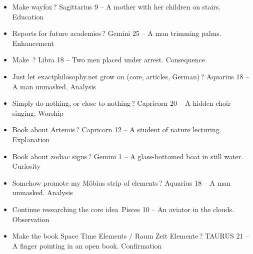 \begin{itemize}

\item[(1)] {\color{xphi}Make wayfox\,?}\newline
Sagittarius 9 – A mother with her children on stairs. {\color{gray}Education}

\vspace{-2mm}
\item[(2)] {\color{xphi}Reports for future academies\,?}\newline
Gemini 25 – A man trimming palms.  {\color{gray}Enhancement}

\vspace{-2mm}
\item[(3)] {\color{xphi}Make \ELEMENTAL\,?}\newline
Libra 18 – Two men placed under arrest.  {\color{gray}Consequence}

\vspace{-2mm}
\item[(4)] {\color{xphi}Just let exactphilosophy.net grow on (core, articles, German)\,?}\newline
Aquarius 18 – A man unmasked.  {\color{gray}Analysis}

\vspace{-2mm}
\item[(5)] {\color{xphi}Simply do nothing, or close to nothing\,?}\newline
Capricorn 20 – A hidden choir singing.  {\color{gray}Worship}

\vspace{-2mm}
\item[(6)] {\color{xphi}Book about Artemis\,?}\newline
Capricorn 12 – A student of nature lecturing.  {\color{gray}Explanation}

\vspace{-2mm}
\item[(7)] {\color{xphi}Book about zodiac signs\,?}\newline
Gemini 1 – A glass-bottomed boat in still water.  {\color{gray}Curiosity}

\vspace{-2mm}
\item[(8)] {\color{xphi}Somehow promote my Möbius strip of elements\,?}\newline
Aquarius 18 – A man unmasked.  {\color{gray}Analysis}

\vspace{-2mm}
\item[(9)] {\color{xphi}Continue researching the core idea\,}\newline
Pisces 10 – An aviator in the clouds.  {\color{gray}Observation}

\vspace{-2mm}
\item[(10)] {\color{xphi} Make the book Space Time Elements / Raum Zeit Elemente\,?}\newline
TAURUS 21 – A finger pointing in an open book.  {\color{gray}Confirmation}

\end{itemize}

